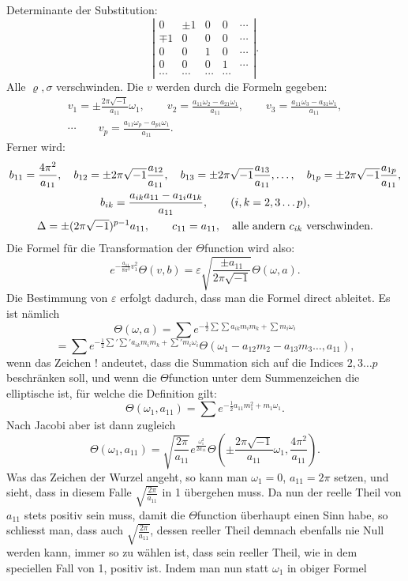 \documentclass[10pt]{article}
\begin{document}
Determinante der Substitution:
\[
\left|\begin{array}{ccccc}
0&\pm1&0&0&\cdots\\
\mp1&0&0&0&\cdots\\
0&0&1&0&\cdots\\
0&0&0&1&\cdots\\
\cdots&\cdots&\cdots&\cdots&
\end{array}\right|.
\]
Alle \(\varrho,\sigma\) verschwinden. Die \(v\) werden durch die Formeln gegeben:
\[
\begin{gathered}
v_1=\pm\frac{2\pi\sqrt{-1}}{a_{11}}\omega_1,\qquad
v_2=\frac{a_{11}\omega_2-a_{21}\omega_1}{a_{11}},\qquad
v_3=\frac{a_{11}\omega_3-a_{31}\omega_1}{a_{11}},\\
\cdots\qquad
v_p=\frac{a_{11}\omega_p-a_{p1}\omega_1}{a_{11}}.
\end{gathered}
\]
Ferner wird:
\[
\begin{gathered}
b_{11}=\frac{4\pi^2}{a_{11}},
\quad b_{12}=\pm2\pi\sqrt{-1}\frac{a_{12}}{a_{11}},
\quad b_{13}=\pm2\pi\sqrt{-1}\frac{a_{13}}{a_{11}},\ldots,
\quad b_{1p}=\pm2\pi\sqrt{-1}\frac{a_{1p}}{a_{11}},\\
b_{ik}=\frac{a_{ik}a_{11}-a_{1i}a_{1k}}{a_{11}},\qquad (i,k=2,3\ldots p),\\
\Delta=\pm(2\pi\sqrt{-1})^{p-1}a_{11},
\qquad c_{11}=a_{11},\quad\hbox{alle andern }c_{ik}\hbox{ verschwinden.}
\end{gathered}
\]
Die Formel für die Transformation der \(\Theta\)function wird also:
\[
e^{-\frac{a_{11}}{8\pi^2}v_1^2}\Theta(v,b)
=\varepsilon\sqrt{\frac{\pm a_{11}}{2\pi\sqrt{-1}}}\Theta(\omega,a).
\]
Die Bestimmung von \(\varepsilon\) erfolgt dadurch, dass man die Formel direct ableitet. Es ist nämlich
\[
\Theta(\omega,a)=\sum e^{-\frac12\sum\sum a_{ik}m_im_k+\sum m_i\omega_i}
\]
\[
=\sum e^{-\frac12\sum{}'\sum{}'a_{ik}m_im_k+\sum{}'m_i\omega_i}
\Theta(\omega_1-a_{12}m_2-a_{13}m_3\ldots,a_{11}),
\]
wenn das Zeichen \(!\) andeutet, dass die Summation sich auf die Indices \(2,3\ldots p\) beschränken soll, und wenn die \(\Theta\)function unter dem Summenzeichen die elliptische ist, für welche die Definition gilt:
\[
\Theta(\omega_1,a_{11})=\sum e^{-\frac12a_{11}m_1^2+m_1\omega_1}.
\]
Nach Jacobi aber ist dann zugleich
\[
\Theta(\omega_1,a_{11})=\sqrt{\frac{2\pi}{a_{11}}}
 e^{\frac{\omega_1^2}{2a_{11}}}
\Theta\left(\pm\frac{2\pi\sqrt{-1}}{a_{11}}\omega_1,\frac{4\pi^2}{a_{11}}\right).
\]
Was das Zeichen der Wurzel angeht, so kann man \(\omega_1=0\), \(a_{11}=2\pi\) setzen, und sieht, dass in diesem Falle \(\sqrt{\frac{2\pi}{a_{11}}}\) in 1 übergehen muss. Da nun der reelle Theil von \(a_{11}\) stets positiv sein muss, damit die \(\Theta\)function überhaupt einen Sinn habe, so schliesst man, dass auch \(\sqrt{\frac{2\pi}{a_{11}}}\), dessen reeller Theil demnach ebenfalls nie Null werden kann, immer so zu wählen ist, dass sein reeller Theil, wie in dem speciellen Fall von 1, positiv ist. Indem man nun statt \(\omega_1\) in obiger Formel
\end{document}
